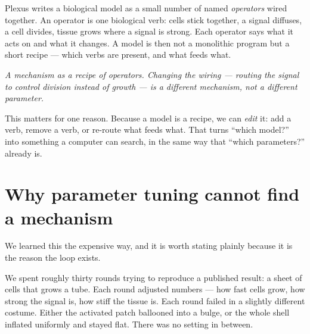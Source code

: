 \documentclass[11pt]{article}
\begin{document}
Plexus writes a biological model as a small number of named \emph{operators} wired together.
An operator is one biological verb: cells stick together, a signal diffuses, a cell divides,
tissue grows where a signal is strong. Each operator says what it acts on and what it changes.
A model is then not a monolithic program but a short recipe --- which verbs are present, and
what feeds what.

\begin{center}
\end{center}
{\small\emph{A mechanism as a recipe of operators. Changing the wiring --- routing the signal to
control division instead of growth --- is a different mechanism, not a different parameter.}}

This matters for one reason. Because a model is a recipe, we can \emph{edit} it: add a verb,
remove a verb, or re-route what feeds what. That turns ``which model?'' into something a
computer can search, in the same way that ``which parameters?'' already is.

\section{Why parameter tuning cannot find a mechanism}

We learned this the expensive way, and it is worth stating plainly because it is the reason the
loop exists.

We spent roughly thirty rounds trying to reproduce a published result: a sheet of cells that
grows a tube. Each round adjusted numbers --- how fast cells grow, how strong the signal is, how
stiff the tissue is. Each round failed in a slightly different costume. Either the activated
patch ballooned into a bulge, or the whole shell inflated uniformly and stayed flat. There was
no setting in between.
\end{document}
